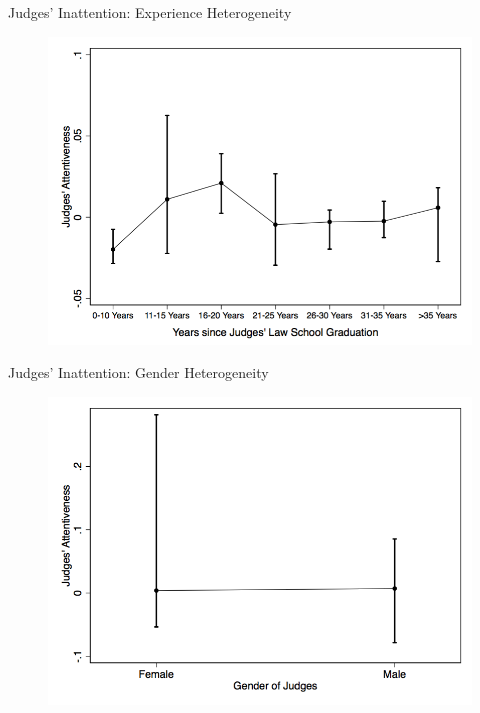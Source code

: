 \begin{frame}{Judges' Inattention: Experience Heterogeneity}
    \begin{figure}
        \centering
        \includegraphics[height = 0.6 \textheight]{images/attent_bylschyr_mean.png}
    \end{figure}
\end{frame}

\begin{frame}{Judges' Inattention: Gender Heterogeneity}
    \begin{figure}
        \centering
        \includegraphics[height = 0.6 \textheight]{images/attent_bygender.png}
    \end{figure}
\end{frame}


